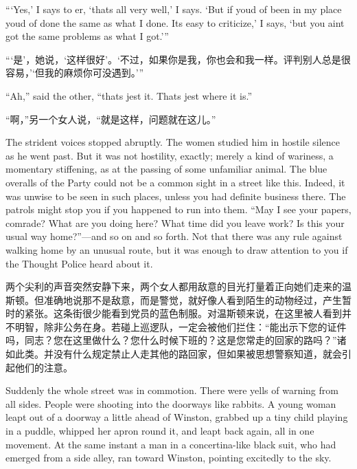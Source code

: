 \begin{paracol}{2}
\switchcolumn*

```Yes,' I says to \textquotesingle er, `that\textquotesingle s all very
well,' I says. `But if you\textquotesingle d of been in my place
you\textquotesingle d of done the same as what I done. It\textquotesingle s
easy to criticize,' I says, `but you ain\textquotesingle t got the same
problems as what I got.'{}''

\switchcolumn

``{}`是'，她说，`这样很好'。`不过，如果你是我，你也会和我一样。评判别人总是很容易，'`但我的麻烦你可没遇到。'{}''

\switchcolumn*

``Ah,'' said the other, ``that\textquotesingle s jest it.
That\textquotesingle s jest where it is.''

\switchcolumn

``啊，''另一个女人说，``就是这样，问题就在这儿。''

\switchcolumn*

The strident voices stopped abruptly. The women studied him in hostile
silence as he went past. But it was not hostility, exactly; merely a
kind of wariness, a momentary stiffening, as at the passing of some
unfamiliar animal. The blue overalls of the Party could not be a common
sight in a street like this. Indeed, it was unwise to be seen in such
places, unless you had definite business there. The patrols might stop
you if you happened to run into them. ``May I see your papers, comrade?
What are you doing here? What time did you leave work? Is this your
usual way home?''---and so on and so forth. Not that there was any rule
against walking home by an unusual route, but it was enough to draw
attention to you if the Thought Police heard about it.

\switchcolumn

两个尖利的声音突然安静下来，两个女人都用敌意的目光打量着正向她们走来的温斯顿。但准确地说那不是敌意，而是警觉，就好像人看到陌生的动物经过，产生暂时的紧张。这条街很少能看到党员的蓝色制服。对温斯顿来说，在这里被人看到并不明智，除非公务在身。若碰上巡逻队，一定会被他们拦住：``能出示下您的证件吗，同志？您在这里做什么？您什么时候下班的？这是您常走的回家的路吗？''诸如此类。并没有什么规定禁止人走其他的路回家，但如果被思想警察知道，就会引起他们的注意。

\switchcolumn*

Suddenly the whole street was in commotion. There were yells of warning
from all sides. People were shooting into the doorways like rabbits. A
young woman leapt out of a doorway a little ahead of Winston, grabbed up
a tiny child playing in a puddle, whipped her apron round it, and leapt
back again, all in one movement. At the same instant a man in a
concertina-like black suit, who had emerged from a side alley, ran
toward Winston, pointing excitedly to the sky.


\end{paracol}
